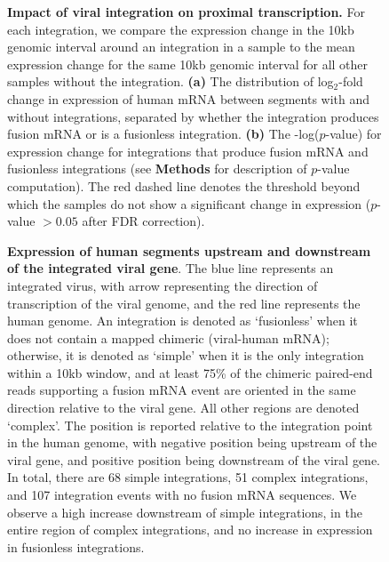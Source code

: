 \documentclass[a4,center,fleqn]{NAR}
\begin{document}
\begin{figure}[htpb] \centering
  \caption[Log$_2$-fold change of expression between genomic segments with
  and without integrations.]  {\label{figure_3} {\bf
        Impact of viral integration on proximal transcription.}  For each integration, we compare the expression change in the 10kb genomic interval around an integration in a sample to the mean expression change for the same 10kb genomic interval for all other samples without the integration.  \textbf{(a)}  The distribution of log$_2$-fold change in expression of human mRNA between segments with and without integrations, separated by whether the integration produces fusion mRNA or is a fusionless integration.  \textbf{(b)} The -log($p$-value) for
  expression change for integrations that produce fusion mRNA and fusionless integrations (see \textbf{Methods} for description of $p$-value computation).  The red dashed line denotes the threshold beyond which the samples do not show a significant change in expression ($p$-value $>0.05$ after FDR correction).}
\end{figure}

\begin{figure}[htpb] \centering
  \caption[Fusion reads supp.]  {\label{updown} {\small {\bf
        Expression of human segments upstream and downstream of the
        integrated viral gene}. The blue line represents
        an integrated virus, with arrow representing the direction of transcription
        of the viral genome, and the red line represents the human genome.  An integration is denoted as
      `fusionless' when it does not contain a mapped chimeric
      (viral-human mRNA); otherwise, it is denoted as `simple' when it
      is the only integration within a 10kb window, and at least 75\%
      of the chimeric paired-end reads supporting a fusion mRNA event
      are oriented in the same direction relative to the viral
      gene. All other regions are denoted `complex'. The position is
      reported relative to the integration point in the human genome,
      with negative position being upstream of the viral gene, and
      positive position being downstream of the viral gene. In total,
      there are 68 simple integrations, 51 complex integrations, and
      107 integration events with no fusion mRNA sequences. We observe
      a high increase downstream of simple integrations, in the entire
      region of complex integrations, and no increase in expression in
      fusionless integrations.}} %
\end{figure}
\end{document}
